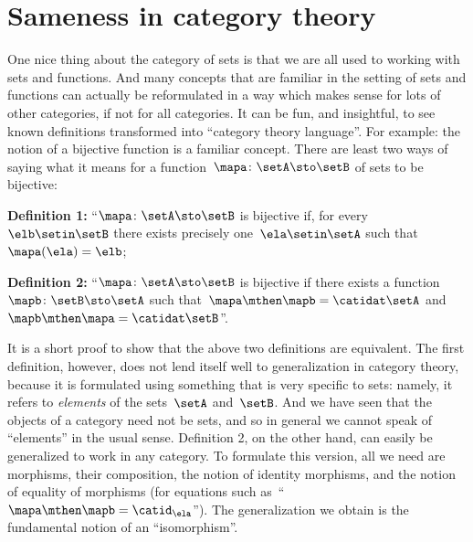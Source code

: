 
\section{Sameness in category theory}
\label{sec:attributes_sameness}

One nice thing about the category of sets is that we are all used to working with sets and functions.
And many concepts that are familiar in the setting of sets and functions can actually be reformulated in a way which makes sense for lots of other categories, if not for all categories.
It can be fun, and insightful, to see known definitions transformed into ``category theory language''.
For example: the notion of a bijective function is a familiar concept.
There are least two ways of saying what it means for a function~$\mapa \colon \setA \sto \setB$ of sets to be bijective:

\textbf{Definition 1:} ``$\mapa \colon \setA \sto \setB$ is bijective if, for every~$\elb \setin \setB$ there exists precisely one~$\ela \setin \setA$ such that~$\mapa(\ela) = \elb$;

\textbf{Definition 2:} ``$\mapa \colon \setA \sto \setB$ is bijective if there exists a function~$\mapb\colon \setB \sto \setA$ such that~$\mapa \mthen \mapb = \catidat\setA$ and~$\mapb \mthen \mapa = \catidat\setB$''.

It is a short proof to show that the above two definitions are equivalent.
The first definition, however, does not lend itself well to generalization in category theory, because it is formulated using something that is very specific to sets: namely, it refers to \emph{elements} of the sets~$\setA$ and~$\setB$.
And we have seen that the objects of a category need not be sets, and so in general we cannot speak of ``elements'' in the usual sense.
Definition 2, on the other hand, can easily be generalized to work in any category.
To formulate this version, all we need are morphisms, their composition, the notion of identity morphisms, and the notion of equality of morphisms (for equations such as~``$\mapa \mthen \mapb= \catid_\ela$'').
The generalization we obtain is the fundamental notion of an ``isomorphism''.


